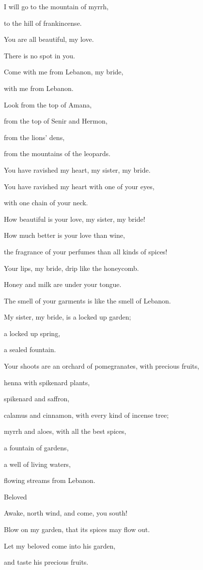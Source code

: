{\par }{\QB I will go to the mountain of myrrh,
\par }{\QB to the hill of frankincense.
\par }{\BB \par }{\Q {}You are all beautiful, my love.
\par }{\QB There is no spot in you.
\par }{\Q {}Come with me from Lebanon, my bride,
\par }{\QB with me from Lebanon.
\par }{\QB Look from the top of Amana,
\par }{\QB from the top of Senir and Hermon,
\par }{\QB from the lions’ dens,
\par }{\QB from the mountains of the leopards.
\par }{\BB \par }{\Q {}You have ravished my heart, my sister, my bride.
\par }{\QB You have ravished my heart with one of your eyes,
\par }{\QB with one chain of your neck.
\par }{\Q {}How beautiful is your love, my sister, my bride!
\par }{\QB How much better is your love than wine,
\par }{\QB the fragrance of your perfumes than all kinds of spices!
\par }{\Q {}Your lips, my bride, drip like the honeycomb.
\par }{\QB Honey and milk are under your tongue.
\par }{\QB The smell of your garments is like the smell of Lebanon.
\par }{\Q {}My sister, my bride, is a locked up garden;
\par }{\QB a locked up spring,
\par }{\QB a sealed fountain.
\par }{\Q {}Your shoots are an orchard of pomegranates, with precious fruits,
\par }{\QB henna with spikenard plants,
\par }{\QB {}spikenard and saffron,
\par }{\QB calamus and cinnamon, with every kind of incense tree;
\par }{\QB myrrh and aloes, with all the best spices,
\par }{\QB {}a fountain of gardens,
\par }{\QB a well of living waters,
\par }{\QB flowing streams from Lebanon.
\par }{\SP Beloved
\par }{\Q {}Awake, north wind, and come, you south!
\par }{\QB Blow on my garden, that its spices may flow out.
\par }{\Q Let my beloved come into his garden,
\par }{\QB and taste his precious fruits.

}
